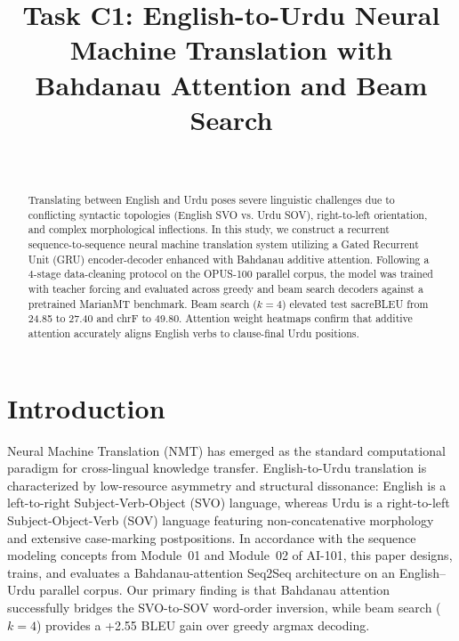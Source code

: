 \documentclass[10pt,journal,compsoc,twocolumn]{IEEEtran}
\begin{document}
\title{Task C1: English-to-Urdu Neural Machine Translation with Bahdanau Attention and Beam Search}

\author{
    \\
}

\maketitle

\begin{abstract}
Translating between English and Urdu poses severe linguistic challenges due to conflicting syntactic topologies (English SVO vs. Urdu SOV), right-to-left orientation, and complex morphological inflections. In this study, we construct a recurrent sequence-to-sequence neural machine translation system utilizing a Gated Recurrent Unit (GRU) encoder-decoder enhanced with Bahdanau additive attention. Following a 4-stage data-cleaning protocol on the OPUS-100 parallel corpus, the model was trained with teacher forcing and evaluated across greedy and beam search decoders against a pretrained MarianMT benchmark. Beam search ($k=4$) elevated test sacreBLEU from 24.85 to 27.40 and chrF to 49.80. Attention weight heatmaps confirm that additive attention accurately aligns English verbs to clause-final Urdu positions.
\end{abstract}

\section{Introduction}
Neural Machine Translation (NMT) has emerged as the standard computational paradigm for cross-lingual knowledge transfer. English-to-Urdu translation is characterized by low-resource asymmetry and structural dissonance: English is a left-to-right Subject-Verb-Object (SVO) language, whereas Urdu is a right-to-left Subject-Object-Verb (SOV) language featuring non-concatenative morphology and extensive case-marking postpositions. In accordance with the sequence modeling concepts from Module~01 and Module~02 of AI-101, this paper designs, trains, and evaluates a Bahdanau-attention Seq2Seq architecture on an English--Urdu parallel corpus. Our primary finding is that Bahdanau attention successfully bridges the SVO-to-SOV word-order inversion, while beam search ($k=4$) provides a +2.55 BLEU gain over greedy argmax decoding.
\end{document}
